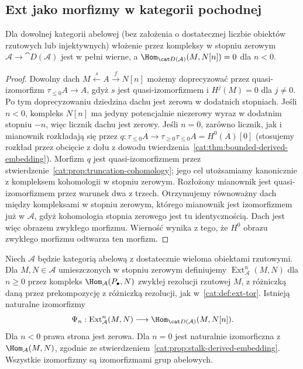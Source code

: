 \subsection{Ext jako morfizmy w kategorii pochodnej}
\begin{stwierdzenie}\label{cat:prop:stalk-derived-embedding}
Dla dowolnej kategorii abelowej (bez założenia o dostatecznej liczbie obiektów rzutowych lub injektywnych) włożenie przez kompleksy w stopniu zerowym $\mathcal A\to\cat D(\mathcal A)$ jest w pełni wierne, a $\Hom_{\cat D(\mathcal A)}(M,N[n])=0$ dla $n<0$.
\end{stwierdzenie}
\begin{proof}
Dowolny dach $M\xleftarrow s A\xrightarrow f N[n]$ możemy doprecyzować przez quasi-izomorfizm $\tau_{\le0}A\to A$, gdyż $s$ jest quasi-izomorfizmem i $H^j(M)=0$ dla $j\ne0$. Po tym doprecyzowaniu dziedzina dachu jest zerowa w dodatnich stopniach. Jeśli $n<0$, kompleks $N[n]$ ma jedyny potencjalnie niezerowy wyraz w dodatnim stopniu $-n$, więc licznik dachu jest zerowy. Jeśli $n=0$, zarówno licznik, jak i mianownik rozkładają się przez $q:\tau_{\le0}A\to\tau_{\ge0}\tau_{\le0}A=H^0(A)[0]$ (stosujemy rozkład przez obcięcie z dołu z dowodu twierdzenia~\ref{cat:thm:bounded-derived-embedding}). Morfizm $q$ jest quasi-izomorfizmem przez stwierdzenie~\ref{cat:prop:truncation-cohomology}; jego cel utożsamiamy kanonicznie z kompleksem kohomologii w stopniu zerowym. Rozłożony mianownik jest quasi-izomorfizmem przez warunek dwa z trzech. Otrzymujemy równoważny dach między kompleksami w stopniu zerowym, którego mianownik jest izomorfizmem już w $\mathcal A$, gdyż kohomologia stopnia zerowego jest tu identycznością. Dach jest więc obrazem zwykłego morfizmu. Wierność wynika z tego, że $H^0$ obrazu zwykłego morfizmu odtwarza ten morfizm.
\end{proof}
\begin{twierdzenie}\label{cat:thm:derived-ext}
Niech $\mathcal A$ będzie kategorią abelową z dostatecznie wieloma obiektami rzutowymi. Dla $M,N\in\mathcal A$ umieszczonych w stopniu zerowym definiujemy $\operatorname{Ext}^n_{\mathcal A}(M,N)$ dla $n\ge0$ przez kompleks $\Hom_{\mathcal A}(P_\bullet,N)$ zwykłej rezolucji rzutowej $M$, z różniczką daną przez prekompozycję z różniczką rezolucji, jak w~\ref{cat:def:ext-tor}. Istnieją naturalne izomorfizmy
\[
 \Psi_n:\operatorname{Ext}^n_{\mathcal A}(M,N)
 \longrightarrow\Hom_{\cat D(\mathcal A)}(M,N[n]).
\]
Dla $n<0$ prawa strona jest zerowa. Dla $n=0$ jest naturalnie izomorficzna z $\Hom_{\mathcal A}(M,N)$, zgodnie ze stwierdzeniem~\ref{cat:prop:stalk-derived-embedding}. Wszystkie izomorfizmy są izomorfizmami grup abelowych.
\end{twierdzenie}
